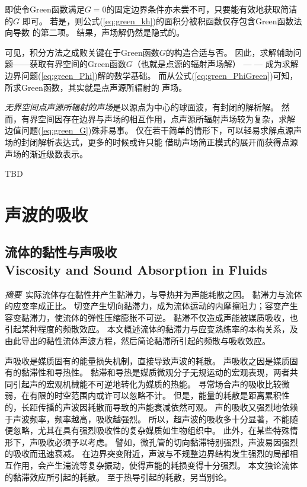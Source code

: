 \documentclass[UTF8]{ctexbook}
\begin{document}
即使令Green函数满足$G=0$的固定边界条件亦未尝不可，只要能有效地获取简洁的$G$
即可。
若是，则公式(\ref{eq:green_kh})的面积分被积函数仅存包含Green函数法向导数
的第二项。
结果，声场解仍然是隐式的。

可见，积分方法之成败关键在于Green函数$G$的构造合适与否。
因此，求解辅助问题------获取有界空间的Green函数$G$（也就是点源的辐射声场解）
--- --- 成为求解边界问题(\ref{eq:green_Phi})解的数学基础。
而从公式(\ref{eq:green_PhiGreen})可知，所求Green函数，其实就是点声源所辐射的
声场。

\emph{无界空间点声源所辐射的声场}是以源点为中心的球面波，有封闭的解析解。
然而，有界空间因存在边界与声场的相互作用，点声源所辐射声场较为复杂，求解
边值问题(\ref{eq:green_G})殊非易事。
仅在若干简单的情形下，可以轻易求解点源声场的封闭解析表达式，更多的时候或许只能
借助声场简正模式的展开而获得点源声场的渐近级数表示。

TBD


\chapter{声波的吸收}

\section{流体的黏性与声吸收\\
Viscosity and Sound Absorption in Fluids}

\emph{摘要}\
实际流体存在黏性并产生黏滞力，与导热并为声能耗散之因。
黏滞力与流体的应变率成正比。
切变产生切向黏滞力，成为流体运动的内摩擦阻力；容变产生容变黏滞力，使流体的弹性压缩膨胀不可逆。
黏滞不仅造成声能被媒质吸收，也引起某种程度的频散效应。
本文概述流体的黏滞力与应变熟练率的本构关系，及由此导出的黏性流体声波方程，然后简论黏滞所引起的频散与吸收效应。

声吸收是媒质固有的能量损失机制，直接导致声波的耗散。
声吸收之因是媒质固有的黏滞性和导热性。
黏滞和导热是媒质微观分子无规运动的宏观表现，两者共同引起声的宏观机械能不可逆地转化为媒质的热能。
寻常场合声的吸收比较微弱，在有限的时空范围内或许可以忽略不计。
但是，能量的耗散是距离累积性的，长距传播的声波因耗散而导致的声能衰减依然可观。
声的吸收又强烈地依赖于声波频率，频率越高，吸收越强烈。
所以，超声波的吸收多十分显著，不能随便忽略，尤其在具有强烈吸收性的复杂媒质如生物组织中。
此外，在某些特殊情形下，声吸收必须予以考虑。
譬如，微孔管的切向黏滞特别强烈，声波易因强烈的吸收而迅速衰减。
在边界突变附近，声波与不规整边界结构发生强烈的局部相互作用，会产生湍流等复杂振动，使得声能的耗损变得十分强烈。
本文独论流体的黏滞效应所引起的耗散。
至于热导引起的耗散，另当别论。
\end{document}

